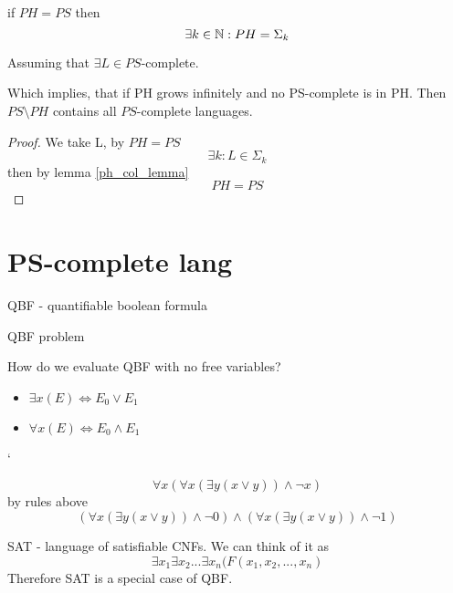 \begin{consequence}
	if $PH = PS$ then
	\[ \exists k \in \operatorname{\mathbb{N}}: PH = \Sigma_k \]

	Assuming that $\exists L \in PS$-complete.

	Which implies, that if PH grows infinitely and no PS-complete is in PH.
	Then $PS \setminus PH$ contains all $PS$-complete languages.
\end{consequence}
\begin{proof}
	We take L, by $PH = PS$
	\[ \exists k: L \in \Sigma_k \]
	then by lemma \cref{ph_col_lemma}
	\[ PH = PS \]
\end{proof}

\section{\texorpdfstring{PS-complete lang}{PS-complete lang}}
\vspace{5mm}
\large

\begin{definition}
	QBF - quantifiable boolean formula
\end{definition}

\begin{definition}
	QBF problem
\end{definition}

How do we evaluate QBF with no free variables?
\begin{itemize}
	\item $ \exists x (E) \iff E_0 \lor E_1$
	\item $ \forall x (E) \iff E_0 \land E_1$
\end{itemize}
`
\begin{example}
	\[ \forall x (\forall x (\exists y (x \lor y)) \land \neg x) \]
	by rules above
	\[ (\forall x (\exists y (x \lor y)) \land \neg 0) \land (\forall x (\exists y (x \lor y)) \land \neg 1) \]
\end{example}

\begin{note}
	SAT - language of satisfiable CNFs.
	We can think of it as
	\[ \exists x_1 \exists x_2 ... \exists x_n (F(x_1, x_2, ..., x_n) \]
	Therefore SAT is a special case of QBF.
\end{note}

